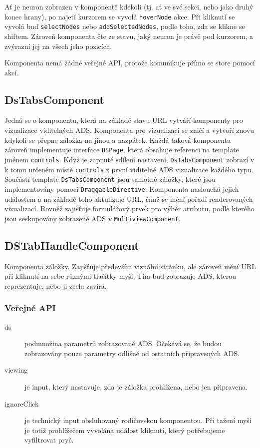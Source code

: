 Ať je neuron zobrazen v komponentě kdekoli (tj. ať ve své sekci, nebo jako druhý konec hrany), po najetí kurzorem se vyvolá \lstinline|hoverNode| akce. Při kliknutí se vyvolá buď \lstinline|selectNodes| nebo \lstinline|addSelectedNodes|, podle toho, zda se klikne se shiftem. Zároveň komponenta čte ze stavu, jaký neuron je právě pod kurzorem, a zvýrazní jej na všech jeho pozicích.

Komponenta nemá žádné veřejné API, protože komunikuje přímo se store pomocí akcí.

\subsection{DsTabsComponent}

Jedná se o komponentu, která na základě stavu URL vytváří komponenty pro vizualizace viditelných ADS. Komponenta pro vizualizaci se zničí a vytvoří znovu kdykoli se přepne záložka na jinou a nazpátek. Každá taková komponenta zároveň implementuje interface \lstinline|DSPage|, která obsahuje referenci na template jménem \lstinline|controls|. Když je zapnuté sdílení nastavení, \lstinline|DsTabsComponent| zobrazí v k tomu určeném místě \lstinline|controls| z první viditelné ADS vizualizace každého typu. Součástí template \lstinline|DsTabsComponent| jsou samotné záložky, které jsou implementovány pomocí \lstinline|DraggableDirective|. Komponenta naslouchá jejich událostem a na základě toho aktulizuje URL, čímž se mění pořadí renderovaných vizualizací. Rovněž zajišťuje formulářový prvek pro výběr atributu, podle kterého jsou seskupovány zobrazené ADS v \lstinline|MultiviewComponent|.

\subsection{DSTabHandleComponent}

Komponenta záložky. Zajišťuje především vizuální stránku, ale zároveň mění URL při kliknutí na sebe různými tlačítky myši. Tím buď zobrazuje ADS, kterou reprezentuje, nebo ji zcela zavírá.

\subsubsection*{Veřejné API}

\begin{description}
  \item[ds] podmnožina parametrů zobrazované ADS. Očekává se, že budou zobrazovány pouze parametry odlišné od ostatních připravených ADS.
  \item[viewing] je input, který nastavuje, zda je záložka prohlížena, nebo jen připravena.
  \item[ignoreClick] je technický input obsluhovaný rodičovskou komponentou. Při tažení myší je totiž prohlížečem vyvolána událost kliknutí, který potřebujeme vyfiltrovat pryč.
\end{description}

